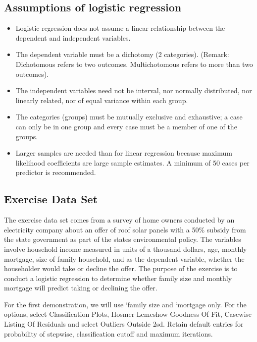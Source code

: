 ﻿\documentclass[a4paper,12pt]{article}
\begin{document}
\subsection{Assumptions of logistic regression}
\begin{itemize}
\item Logistic regression does not assume a linear relationship between the dependent and
independent variables.
\item The dependent variable must be a dichotomy (2 categories).
(Remark: Dichotomous refers to two outcomes. Multichotomous refers to more than two outcomes).
\item The independent variables need not be interval, nor normally distributed, nor linearly
related, nor of equal variance within each group.
\item The categories (groups) must be mutually exclusive and exhaustive; a case can only be
in one group and every case must be a member of one of the groups.
\item Larger samples are needed than for linear regression because maximum likelihood
coefficients are large sample estimates. A minimum of 50 cases per predictor is
recommended.
\end{itemize}
\subsection{Exercise Data Set}
The exercise data set comes from a survey of home owners
conducted by an electricity company about an offer of roof solar panels with a 50\% subsidy
from the state government as part of the states environmental policy. The variables involve
household income measured in units of a thousand dollars, age, monthly mortgage, size of
family household, and as the dependent variable, whether the householder would take or decline the offer.
The purpose of the exercise is to conduct a logistic regression to determine whether family
size and monthly mortgage will predict taking or declining the offer.

For the first demonstration, we will use `family size and
`mortgage only. For the options, select Classification Plots, Hosmer-Lemeshow Goodness
Of Fit, Casewise Listing Of Residuals and select Outliers Outside 2sd. Retain default
entries for probability of stepwise, classification cutoff and maximum iterations.
\end{document}
